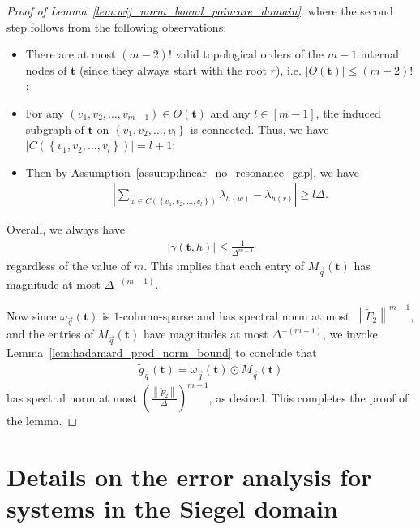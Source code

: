 \documentclass[superscriptaddress,onecolumn,nofootinbib,longbibliography,a4paper,accepted=2026-09-29]{quantumarticle}
\theoremstyle{plain}
\theoremstyle{definition}
\numberwithin{thm}{section}
\numberwithin{assumption}{section}
\numberwithin{lemma}{section}
\numberwithin{prop}{section}
\numberwithin{cor}{section}
\numberwithin{definition}{section}
\numberwithin{rmk}{section}
\numberwithin{equation}{section}
\newcommand{\abs}[1]      {\left| #1 \right|}
\newcommand{\norm}[1]     {\left\| #1 \right\|}
\newcommand{\lrb}[1]{\left ( #1 \right )}
\newcommand{\lrcb}[1]{\left \{ #1 \right \}}
\newcommand{\mbt}{\mathbf{t}}
\begin{document}
\begin{proof} [Proof of Lemma~\ref{lem:wij_norm_bound_poincare_domain}]
where the second step follows from the following observations:
\begin{itemize}
    \item There are at most $(m-2)!$ valid topological orders of the $m-1$ internal nodes of $\mbt$ (since they always start with the root $r$), i.e. $|O(\mbt)| \le (m-2)!$;
    \item For any $(v_1,v_2,\dots,v_{m-1}) \in O(\mbt)$ and any $l \in [m-1]$, the induced subgraph of $\mbt$ on $\lrcb{v_1,v_2,\dots,v_l}$ is connected. Thus, we have
    $|C(\lrcb{v_1,v_2,\dots,v_l})|=l+1$;
    \item Then by Assumption~\ref{assump:linear_no_resonance_gap}, we have 
    \begin{align}
        \abs{\sum_{w \in C(\lrcb{v_1,v_2,\dots,v_l})} \lambda_{h(w)} -\lambda_{h(r)}} \ge l \Delta.
    \end{align}
\end{itemize}
Overall, we always have
\begin{align}
    \abs{\gamma(\mbt, h)} \le \frac{1}{\Delta^{m-1}}
\end{align}
regardless of the value of $m$. This implies that each entry of $M_{\vec q}(\mbt)$ has magnitude at most $\Delta^{-(m-1)}$.

Now since $\omega_{\vec q}(\mbt)$ is $1$-column-sparse and has spectral norm at most $\norm{\tilde{F}_2}^{m-1}$, and the entries of $M_{\vec q}(\mbt)$ have magnitudes at most $\Delta^{-(m-1)}$, we invoke Lemma~\ref{lem:hadamard_prod_norm_bound} to conclude that 
\begin{align}
\tilde{g}_{\vec q}(\mbt) = \omega_{\vec q}(\mbt) \odot M_{\vec q}(\mbt)    
\end{align}
has spectral norm at most $\lrb{\frac{\norm{\tilde{F}_2}}{\Delta}}^{m-1}$, as desired. This completes the proof of the lemma.
\end{proof}




\section{Details on the error analysis for systems in the Siegel domain}
\label{app:error_analysis_siegel_domain}
\end{document}
